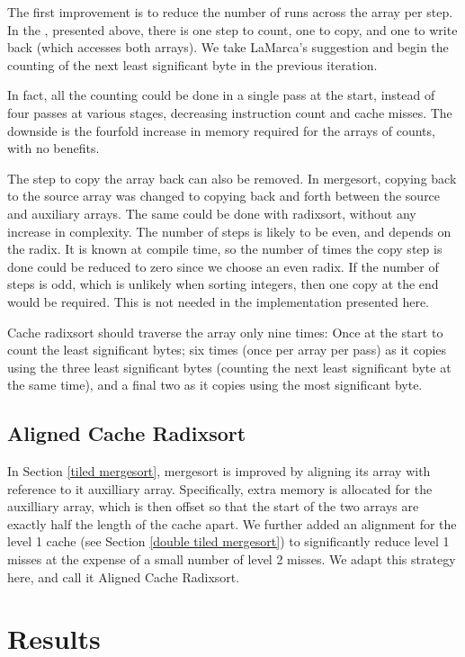 The first improvement is to reduce the number of runs across the array per
step.  In the , presented above, there is one step to count,
one to copy, and one to write back (which accesses both arrays). We take
LaMarca's suggestion and begin the counting of the next least significant byte
in the previous iteration.

In fact, all the counting could be done in a single pass at the start, instead
of four passes at various stages, decreasing instruction count and cache misses.
The downside is the fourfold increase in memory required for the arrays of
counts, with no benefits.

The step to copy the array back can also be removed. In mergesort, copying back
to the source array was changed to copying back and forth between the source and
auxiliary arrays. The same could be done with radixsort, without any increase in
complexity. The number of steps is likely to be even, and depends on the radix.
It is known at compile time, so the number of times the copy step is done could
be reduced to zero since we choose an even radix. If the number of steps is odd,
which is unlikely when sorting integers, then one copy at the end would be
required. This is not needed in the implementation presented here.

Cache radixsort should traverse the array only nine times: Once at the start to
count the least significant bytes; six times (once per array per pass) as it
copies using the three least significant bytes (counting the next least
significant byte at the same time), and a final two as it copies using the most
significant byte.


\subsection{Aligned Cache Radixsort}
In Section \ref{tiled mergesort}, mergesort is improved by aligning its array
with reference to it auxilliary array. Specifically, extra memory is allocated
for the auxilliary array, which is then offset so that the start of the two
arrays are exactly half the length of the cache apart. We further added an
alignment for the level 1 cache (see Section \ref{double tiled mergesort}) to
significantly reduce level 1 misses at the expense of a small number of level 2
misses. We adapt this strategy here, and call it Aligned Cache Radixsort.


\section{Results}
